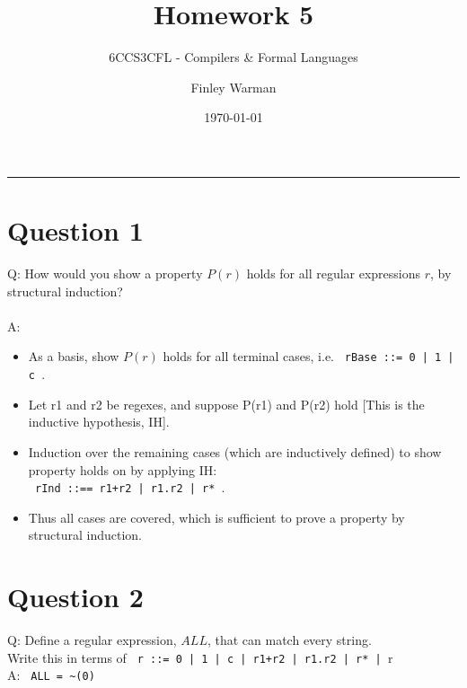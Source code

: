 \documentclass[english]{scrartcl}
\begin{document}


\subtitle{6CCS3CFL - Compilers \& Formal Languages}
\title{Homework 5}
\author{Finley Warman}
\date{\today}

\maketitle


\tableofcontents
\par\noindent\rule{\textwidth}{0.4pt}


\newpage


\section*{Question 1}
Q: How would you show a property $P(r)$ holds for all regular expressions $r$, by structural induction?
\\
\\
A:
\begin{itemize}
    \item As a basis, show $P(r)$ holds for all terminal cases, i.e. \verb~ rBase ::= 0 | 1 | c ~.
    \item Let r1 and r2 be regexes, and suppose P(r1) and P(r2) hold [This is the inductive hypothesis, IH].
    \item Induction over the remaining cases (which are inductively defined) to show property holds on by applying IH: \\
        \verb~ rInd ::== r1+r2 | r1.r2 | r* ~.
    \item Thus all cases are covered, which is sufficient to prove a property by structural induction.
\end{itemize}

\section*{Question 2}
Q: Define a regular expression, $ALL$, that can match every string. \\
Write this in terms of \verb~ r ::= 0 | 1 | c | r1+r2 | r1.r2 | r* | ~r ~
\\
A: \verb| ALL = ~(0)|
\end{document}
